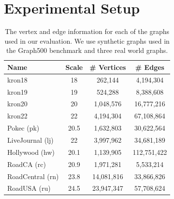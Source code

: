 %


\section{Experimental Setup}

\begin{table}[]
    \centering
    \begin{footnotesize}
    \begin{tabular}{lccc}
    \toprule
     \textbf{Name} & \textbf{Scale} & \textbf{\# Vertices} & \textbf{\# Edges} \\ \midrule %
     kron18 & 18 & 262,144 & 4,194,304 \\ %
     kron19 & 19 & 524,288 & 8,388,608 \\
     kron20 & 20 & 1,048,576 & 16,777,216 \\ %
     kron22 & 22 & 4,194,304 & 67,108,864 \\ %
     Pokec (pk) & 20.5 & 1,632,803 & 30,622,564 \\ %
     LiveJournal (lj) & 22 & 3,997,962 & 34,681,189 \\ %
     Hollywood (hw)& 20.1 & 1,139,905 & 112,751,422 \\
     RoadCA (rc)& 20.9 & 1,971,281 & 5,533,214 \\
     RoadCentral (rn)& 23.8 & 14,081,816 & 33,866,826 \\
     RoadUSA (ru)& 24.5 & 23,947,347 & 57,708,624\\
     \bottomrule
    \end{tabular}
    \end{footnotesize}
    \caption{The vertex and edge information for each of the graphs used in our evaluation. We use synthetic \kron graphs used in the Graph500 benchmark and three real world graphs.}
    \label{sec:eval:tab:graphs}
\end{table}

